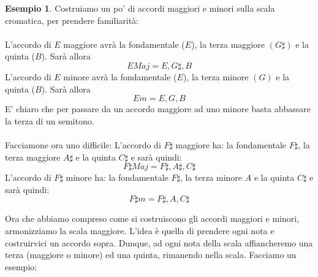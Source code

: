 \documentclass[12pt,a4paper]{book}
\theoremstyle{definition}
\theoremstyle{Theorem}
\theoremstyle{definition}
\newtheorem{Ex}[Def]{Esempio}
\theoremstyle{definition}
\theoremstyle{definition}
\begin{document}
	 		\begin{Ex}
	 			Costruiamo un po' di accordi maggiori e minori sulla scala cromatica, per prendere familiarità:\\
	 			\\
	 			L'accordo di $E$ maggiore avrà la fondamentale ($E$), la terza maggiore $(G\sharp)$ e la quinta ($B$). Sarà allora
	 			$$EMaj=E,G\sharp,B$$
	 			L'accordo di $E$ minore avrà la fondamentale ($E$), la terza minore $(G)$ e la quinta ($B$). Sarà allora 
	 			$$Em=E,G,B$$
	 			E' chiaro che per passare da un accordo maggiore ad uno minore basta abbassare la terza di un semitono.\\
	 			\\
	 			Facciamone ora uno difficile: L'accordo di $F\sharp$ maggiore ha: la fondamentale $F\sharp$, la terza maggiore $A\sharp$ e la quinta $C\sharp$ e sarà quindi:
	 			$$F\sharp Maj=F\sharp,A\sharp,C\sharp$$
	 			L'accordo di $F\sharp$ minore ha: la fondamentale $F\sharp$, la terza minore $A$ e la quinta $C\sharp$ e sarà quindi:
	 			$$F\sharp m=F\sharp,A,C\sharp$$
	 		\end{Ex}
	 		Ora che abbiamo compreso come si costruiscono gli accordi maggiori e minori, armonizziamo la scala maggiore. L'idea è quella di prendere ogni nota e costruirvici un accordo sopra. Dunque, ad ogni nota della scala affiancheremo una terza (maggiore o minore) ed una quinta, rimanendo nella scala. Facciamo un esempio:
\end{document}
